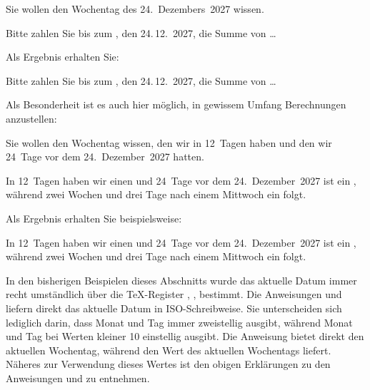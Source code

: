 \begin{Example}
   Sie wollen den Wochentag des 24.~Dezembers~2027 wissen.
\begin{lstcode}
  Bitte zahlen Sie bis zum , 
  den 24.\,12.~2027, die Summe von \dots
\end{lstcode}
  Als Ergebnis erhalten Sie:
  \begin{ShowOutput}
  Bitte zahlen Sie bis zum 
  , den 
  24.\,12.~2027, die Summe von \dots
  \end{ShowOutput}
\end{Example}
 
Als Besonderheit ist es auch hier möglich, in gewissem Umfang Berechnungen
anzustellen:
\begin{Example}
  Sie wollen den Wochentag wissen, den wir in 12~Tagen haben und
  den wir 24~Tage vor dem 24.~Dezember~2027 hatten.
\begin{lstcode}
  In 12~Tagen haben wir einen 
   und
  24~Tage vor dem 24.~Dezember~2027 ist ein
  , während zwei Wochen 
  und drei Tage nach einem Mittwoch ein 
   folgt.
\end{lstcode}
  Als Ergebnis erhalten Sie beispielsweise:
  \begin{ShowOutput}
  In 12~Tagen haben wir einen 
   und
  24~Tage vor dem 24.~Dezember~2027 ist ein
  , während
  zwei Wochen und drei Tage nach
  einem Mittwoch ein 
  folgt.
  \end{ShowOutput}
\end{Example}%
%
\EndIndexGroup
\ExampleEndFix


\begin{Declaration}
\end{Declaration}%
In den bisherigen Beispielen dieses Abschnitts wurde das aktuelle Datum immer
recht umständlich über die \TeX-Register ,
,  bestimmt. Die
Anweisungen  und
 liefern direkt das aktuelle Datum in ISO-Schreibweise. Sie
unterscheiden sich lediglich darin, dass  Monat und Tag immer
zweistellig ausgibt, während  Monat und Tag bei Werten kleiner
10 einstellig ausgibt. Die Anweisung  bietet direkt den
aktuellen Wochentag, während  den Wert des aktuellen
Wochentags liefert. Näheres zur Verwendung dieses Wertes ist den obigen
Erklärungen zu den Anweisungen  und
 zu entnehmen.

